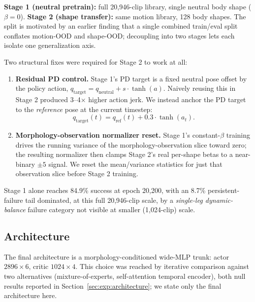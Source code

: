 \textbf{Stage 1 (neutral pretrain):} full 20{,}946-clip library, single neutral body shape
($\beta = 0$). \textbf{Stage 2 (shape transfer):} same motion library, 128 body shapes. The split
is motivated by an earlier finding that a single combined train/eval split conflates motion-OOD
and shape-OOD; decoupling into two stages lets each isolate one generalization axis.

Two structural fixes were required for Stage 2 to work at all:

\begin{enumerate}
  \item \textbf{Residual PD control.} Stage 1's PD target is a fixed neutral pose offset by the
  policy action, $q_{\text{target}} = q_{\text{neutral}} + s \cdot \tanh(a)$. Naively reusing this
  in Stage 2 produced 3--4$\times$ higher action jerk. We instead anchor the PD target to the
  \emph{reference} pose at the current timestep:
  \begin{equation}
    q_{\text{target}}(t) = q_{\text{ref}}(t) + 0.3 \cdot \tanh(a_t).
    \label{eq:residual-pd}
  \end{equation}
  \item \textbf{Morphology-observation normalizer reset.} Stage 1's constant-$\beta$ training
  drives the running variance of the morphology-observation slice toward zero; the resulting
  normalizer then clamps Stage 2's real per-shape betas to a near-binary $\pm 5$ signal. We reset
  the mean/variance statistics for just that observation slice before Stage 2 training.
\end{enumerate}

Stage 1 alone reaches 84.9\% success at epoch 20{,}200, with an 8.7\% persistent-failure tail
dominated, at this full 20{,}946-clip scale, by a \emph{single-leg dynamic-balance} failure
category not visible at smaller (1{,}024-clip) scale.

\subsection{Architecture}
\label{sec:method:architecture}

The final architecture is a morphology-conditioned wide-MLP trunk: actor $2896 \times 6$, critic
$1024 \times 4$. This choice was reached by iterative comparison against two alternatives
(mixture-of-experts, self-attention temporal encoder), both null results reported in
Section~\ref{sec:exp:architecture}; we state only the final architecture here.

